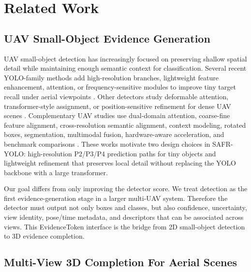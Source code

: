 \section{Related Work}
\label{sec:related_work}

\subsection{UAV Small-Object Evidence Generation}
\label{sec:rw_uav_small_object}

UAV small-object detection has increasingly focused on preserving shallow
spatial detail while maintaining enough semantic context for classification.
Several recent YOLO-family methods add high-resolution branches, lightweight
feature enhancement, attention, or frequency-sensitive modules to improve tiny
target recall under aerial viewpoints
\cite{hu2024universalyolo,jiang2024mffsodnet,li2024dsyolov5s,bai2025sffefyolo,luo2026fmfnyolo,xie2026dgtsod,chao2025bpdyolo,han2025lrds}.
Other detectors study deformable attention, transformer-style assignment, or
position-sensitive refinement for dense UAV scenes
\cite{hu2025csfprrtdetr,hu2026hfdifine,li2026dfformer,chen2026ufodetr,tan2025rtuavsod,yang2026uavdet}.
Complementary UAV studies use dual-domain attention, coarse-fine feature
alignment, cross-resolution semantic alignment, context modeling, rotated
boxes, segmentation, multimodal fusion, hardware-aware acceleration, and
benchmark comparisons
\cite{wang2026d2adetector,bi2025cfia,tu2026dcocrsa,han2022csadet,ye2022glfnet,lin2025fgunet,tang2026affnet,ghanta2026shield8uav,sadeghibakhi2025comparison}.
These works motivate two design choices in SAFR-YOLO: high-resolution P2/P3/P4
prediction paths for tiny objects and lightweight refinement that preserves
local detail without replacing the YOLO backbone with a large transformer.

Our goal differs from only improving the detector score. We treat detection as
the first evidence-generation stage in a larger multi-UAV system. Therefore the
detector must output not only boxes and classes, but also confidence,
uncertainty, view identity, pose/time metadata, and descriptors that can be
associated across views. This EvidenceToken interface is the bridge from 2D
small-object detection to 3D evidence completion.

\subsection{Multi-View 3D Completion For Aerial Scenes}
\label{sec:rw_3d_completion}

